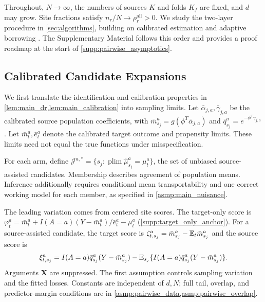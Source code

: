 \documentclass[12pt]{article}
\begin{document}
Throughout, $N\to\infty$, the numbers of sources $K$ and folds $K_f$ are fixed, and $d$ may grow. Site fractions satisfy $n_r/N\to\rho_r^{\mathrm{all}}>0$. We study the two-layer procedure in \cref{sec:algorithms}, building on calibrated estimation \citep{tan2020model,smucler2019unifying,hou2025efficient} and adaptive borrowing \citep{han2025federated}. The Supplementary Material follows this order and provides a proof roadmap at the start of \cref{supp:pairwise_asymptotics}.

\subsection{Calibrated Candidate Expansions}\label{sec:source_inference}

We first translate the identification and calibration properties in \cref{lem:main_dr,lem:main_calibration} into sampling limits. Let $\bar\alpha_{j,a},\bar\gamma_{j,a}$ be the calibrated source population coefficients, with $\bar m_{s_j}^a=g(\phi^T\bar\alpha_{j,a})$ and $\bar q_{s_j}^a=e^{-\phi^T\bar\gamma_{j,a}}$. Let $\bar m_t^a,\bar e_t^a$ denote the calibrated target outcome and propensity limits. These limits need not equal the true functions under misspecification.

For each arm, define $\mathcal J^{a,*}=\{s_j:\operatorname{plim}\widehat\mu_{s_j}^a=\mu_t^a\}$, the set of unbiased source-assisted candidates. Membership describes agreement of population means. Inference additionally requires conditional mean transportability and one correct working model for each member, as specified in \cref{asmp:main_nuisance}.

The leading variation comes from centered site scores. The target-only score is $\varphi_t^a=\bar m_t^a+I(A=a)(Y-\bar m_t^a)/\bar e_t^a-\mu_t^a$ (\cref{supp:target_only_anchor}). For a source-assisted candidate, the target score is $\zeta_{t,s_j}^a=\bar m_{s_j}^a-\mathbb{E}_t\bar m_{s_j}^a$ and the source score is
\[
\xi_{t,s_j}^a=I(A=a)\bar q_{s_j}^a(Y-\bar m_{s_j}^a)
-\mathbb{E}_{s_j}\{I(A=a)\bar q_{s_j}^a(Y-\bar m_{s_j}^a)\}.
\]
Arguments $\boldsymbol X$ are suppressed. The first assumption controls sampling variation and the fitted losses. Constants are independent of $d,N$; full tail, overlap, and predictor-margin conditions are in \cref{asmp:pairwise_data,asmp:pairwise_overlap}.
\end{document}
